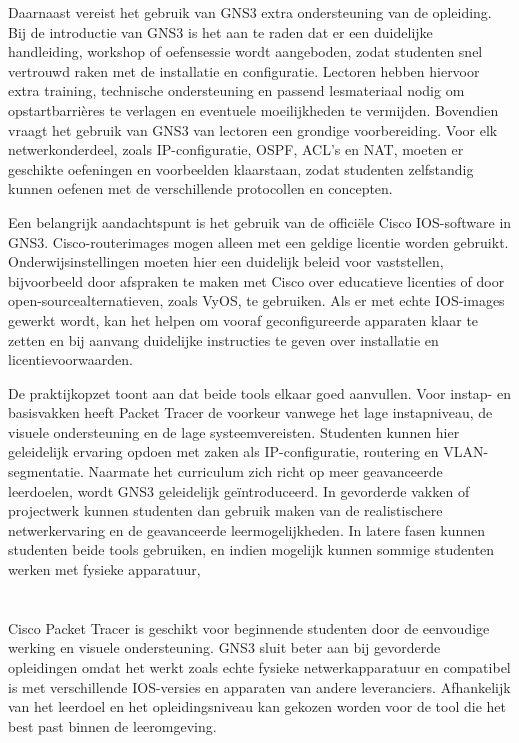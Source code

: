 \vspace{0.3cm}

Daarnaast vereist het gebruik van GNS3 extra ondersteuning van de opleiding. Bij de introductie van GNS3 is het aan te raden dat er een duidelijke handleiding, workshop of oefensessie wordt aangeboden, zodat studenten snel vertrouwd raken met de installatie en configuratie. Lectoren hebben hiervoor extra training, technische ondersteuning en passend lesmateriaal nodig om opstartbarrières te verlagen en eventuele moeilijkheden te vermijden. Bovendien vraagt het gebruik van GNS3 van lectoren een grondige voorbereiding. Voor elk netwerkonderdeel, zoals IP-configuratie, OSPF, ACL's en NAT, moeten er geschikte oefeningen en voorbeelden klaarstaan, zodat studenten zelfstandig kunnen oefenen met de verschillende protocollen en concepten.

\vspace{0.3cm}

Een belangrijk aandachtspunt is het gebruik van de officiële Cisco IOS-software in GNS3. Cisco-routerimages mogen alleen met een geldige licentie worden gebruikt. Onderwijsinstellingen moeten hier een duidelijk beleid voor vaststellen, bijvoorbeeld door afspraken te maken met Cisco over educatieve licenties of door open-sourcealternatieven, zoals VyOS, te gebruiken. Als er met echte IOS-images gewerkt wordt, kan het helpen om vooraf geconfigureerde apparaten klaar te zetten en bij aanvang duidelijke instructies te geven over installatie en licentievoorwaarden.

\vspace{0.3cm}

De praktijkopzet toont aan dat beide tools elkaar goed aanvullen. Voor instap- en basisvakken heeft Packet Tracer de voorkeur vanwege het lage instapniveau, de visuele ondersteuning en de lage systeemvereisten. Studenten kunnen hier geleidelijk ervaring opdoen met zaken als IP-configuratie, routering en VLAN-segmentatie. Naarmate het curriculum zich richt op meer geavanceerde leerdoelen, wordt GNS3 geleidelijk geïntroduceerd. In gevorderde vakken of projectwerk kunnen studenten dan gebruik maken van de realistischere netwerkervaring en de geavanceerde leermogelijkheden. In latere fasen kunnen studenten beide tools gebruiken, en indien mogelijk kunnen sommige studenten werken met fysieke apparatuur,

\vspace{0.3cm}

\section{}

Cisco Packet Tracer is geschikt voor beginnende studenten door de eenvoudige werking en visuele ondersteuning. GNS3 sluit beter aan bij gevorderde opleidingen omdat het werkt zoals echte fysieke netwerkapparatuur en compatibel is met verschillende IOS-versies en apparaten van andere leveranciers. Afhankelijk van het leerdoel en het opleidingsniveau kan gekozen worden voor de tool die het best past binnen de leeromgeving.


